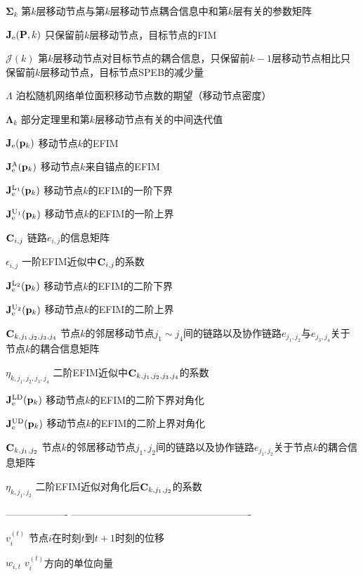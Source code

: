 \documentclass{article}%
\newcommand\V[1]{\mathrm{\bf{#1}}}
\newcommand\Tx[1]{\mathrm{#1}}
\newcommand\Se[1]{\mathcal{#1}}
\begin{document}
\begin{denotation}[3cm]
  \item[$\bm{\Sigma}_k$] 第$k$层移动节点与第$k$层移动节点耦合信息中和第$k$层有关的参数矩阵
  \item[$\V{J}_{\Tx{e}}(\V{P},k)$] 只保留前$k$层移动节点，目标节点的FIM
  \item[$\Se{J}(k)$] 第$k$层移动节点对目标节点的耦合信息，只保留前$k-1$层移动节点相比只保留前$k$层移动节点，目标节点SPEB的减少量
  \item[$\Lambda$] 泊松随机网络单位面积移动节点数的期望（移动节点密度）
  \item[$\bm{\Lambda}_k$] 部分定理里和第$k$层移动节点有关的中间迭代值
  \item[$\V{J}_{\Tx{e}}(\V{p}_k)$] 移动节点$k$的EFIM
  \item[$\V{J}_{\Tx{e}}^{\Tx{A}}(\V{p}_k)$] 移动节点$k$来自锚点的EFIM
  \item[$\V{J}_{\Tx{e}}^{\Tx{L}_1}(\V{p}_k)$] 移动节点$k$的EFIM的一阶下界
  \item[$\V{J}_{\Tx{e}}^{\Tx{U}_1}(\V{p}_k)$] 移动节点$k$的EFIM的一阶上界
  \item[$\V{C}_{i,j}$] 链路$e_{i,j}$的信息矩阵
  \item[$\epsilon_{i,j}$] 一阶EFIM近似中$\V{C}_{i,j}$的系数
  \item[$\V{J}_{\Tx{e}}^{\Tx{L}_2}(\V{p}_k)$] 移动节点$k$的EFIM的二阶下界
  \item[$\V{J}_{\Tx{e}}^{\Tx{U}_2}(\V{p}_k)$] 移动节点$k$的EFIM的二阶上界
  \item[$\V{C}_{k,j_1,j_2,j_3,j_4}$] 节点$k$的邻居移动节点$j_1\sim j_4$间的链路以及协作链路$e_{j_1,j_2}$与$e_{j_3,j_4}$关于节点$k$的耦合信息矩阵
  \item[$\eta_{k,j_1,j_2,j_3,j_4}$] 二阶EFIM近似中$\V{C}_{k,j_1,j_2,j_3,j_4}$的系数
  \item[$\V{J}_{\Tx{e}}^{\Tx{LD}}(\V{p}_k)$] 移动节点$k$的EFIM的二阶下界对角化
  \item[$\V{J}_{\Tx{e}}^{\Tx{UD}}(\V{p}_k)$] 移动节点$k$的EFIM的二阶上界对角化
  \item[$\V{C}_{k,j_1,j_2}$] 节点$k$的邻居移动节点$j_1,j_2$间的链路以及协作链路$e_{j_1,j_2}$关于节点$k$的耦合信息矩阵
  \item[$\eta_{k,j_1,j_2}$] 二阶EFIM近似对角化后$\V{C}_{k,j_1,j_2}$的系数
  \item[-------------------] -------------------------------------------------------
  \item[$v_i^{(t)}$] 节点$i$在时刻$t$到$t+1$时刻的位移
  \item[$w_{i,t}$] $v_i^{(t)}$方向的单位向量

\end{denotation}
\end{document}
